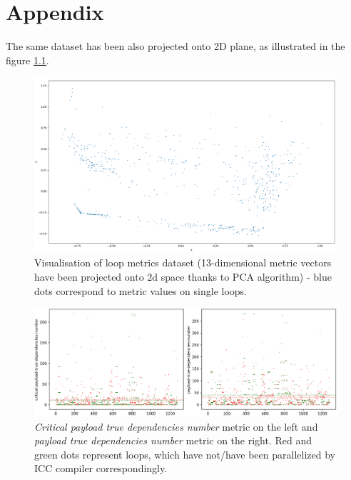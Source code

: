 \chapter{Appendix}
\label{appendix}

\qquad The same dataset has been also projected onto 2D plane, as illustrated in the figure \ref{metrics-pca-13-to-2}.

\begin{figure}[htb]
	\centering
	\includegraphics[width=\linewidth]{figs/metrics-pca-13-to-2.png}
	\caption{Visualisation of loop metrics dataset (13-dimensional metric vectors have been projected onto 2d space thanks to PCA algorithm) - blue dots correspond to metric values on single loops.}
	\label{metrics-pca-13-to-2}
\end{figure}

\begin{figure}[h]
	\centering
	\includegraphics[width=\linewidth]{figs/loop-dependencies-number-1.png}
	\caption{\textit{Critical payload true dependencies number} metric on the left and \textit{payload true dependencies number} metric on the right. Red and green dots represent loops, which have not/have been parallelized by ICC compiler correspondingly.}
	\label{loop-dependencies-number-1}
\end{figure}

